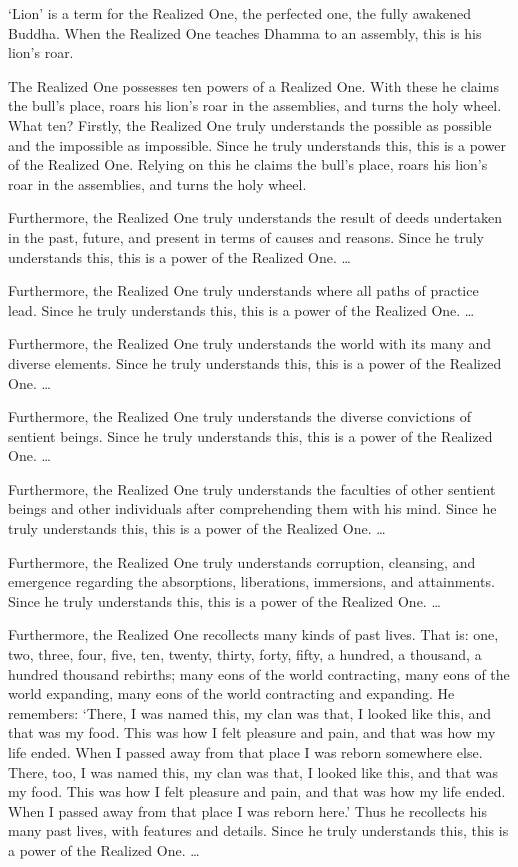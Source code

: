 \documentclass[12pt,openany]{book}%
\begin{document}
‘Lion’ is a term for the Realized One, the perfected one, the fully awakened Buddha. When the Realized One teaches Dhamma to an assembly, this is his lion’s roar. 

The Realized One possesses ten powers of a Realized One. With these he claims the bull’s place, roars his lion’s roar in the assemblies, and turns the holy wheel. What ten? Firstly, the Realized One truly understands the possible as possible and the impossible as impossible. Since he truly understands this, this is a power of the Realized One. Relying on this he claims the bull’s place, roars his lion’s roar in the assemblies, and turns the holy wheel. 

Furthermore, the Realized One truly understands the result of deeds undertaken in the past, future, and present in terms of causes and reasons. Since he truly understands this, this is a power of the Realized One. … 

Furthermore, the Realized One truly understands where all paths of practice lead. Since he truly understands this, this is a power of the Realized One. … 

Furthermore, the Realized One truly understands the world with its many and diverse elements. Since he truly understands this, this is a power of the Realized One. … 

Furthermore, the Realized One truly understands the diverse convictions of sentient beings. Since he truly understands this, this is a power of the Realized One. … 

Furthermore, the Realized One truly understands the faculties of other sentient beings and other individuals after comprehending them with his mind. Since he truly understands this, this is a power of the Realized One. … 

Furthermore, the Realized One truly understands corruption, cleansing, and emergence regarding the absorptions, liberations, immersions, and attainments. Since he truly understands this, this is a power of the Realized One. … 

Furthermore, the Realized One recollects many kinds of past lives. That is: one, two, three, four, five, ten, twenty, thirty, forty, fifty, a hundred, a thousand, a hundred thousand rebirths; many eons of the world contracting, many eons of the world expanding, many eons of the world contracting and expanding. He remembers: ‘There, I was named this, my clan was that, I looked like this, and that was my food. This was how I felt pleasure and pain, and that was how my life ended. When I passed away from that place I was reborn somewhere else. There, too, I was named this, my clan was that, I looked like this, and that was my food. This was how I felt pleasure and pain, and that was how my life ended. When I passed away from that place I was reborn here.’ Thus he recollects his many past lives, with features and details. Since he truly understands this, this is a power of the Realized One. … 
\end{document}
